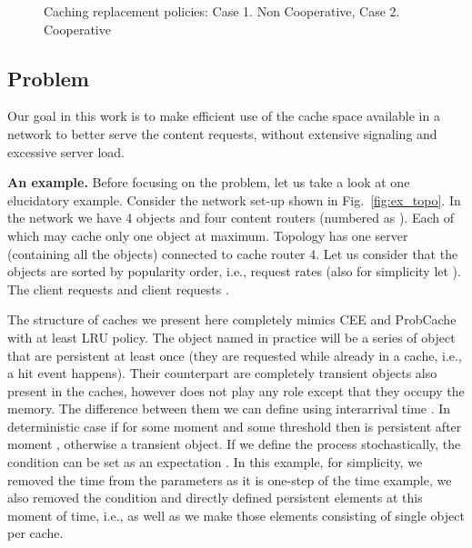 \documentclass[article]{elsarticle}
\begin{document}
\begin{figure}[t]
\centering
{}
\raisebox{3cm}{\textbf{}} 
\qquad
{}
\caption{Caching replacement policies: Case 1. Non Cooperative, Case 2. Cooperative}
\label{fig:example}
\end{figure}

\subsection{Problem}
Our goal in this work is to make efficient use of the cache space available in a network to better serve the content requests, without extensive signaling and excessive server load.

\textbf{An example.} Before focusing on the problem, let us take a look at one elucidatory example. Consider the network set-up shown in Fig.~\ref{fig:ex_topo}. In the network we have 4 objects  and four content routers (numbered as ). Each of which may cache only one object at maximum. Topology has one server (containing all the objects) connected to cache router 4. Let us consider that the objects are sorted by popularity order, i.e., request rates  (also for simplicity let ). The client  requests  and client  requests .

The structure of caches we present here completely mimics CEE and ProbCache with at least LRU policy. The object named  in practice will be a series of object that are persistent at least once (they are requested while already in a cache, i.e., a hit event happens). Their counterpart are completely transient objects  also present in the caches, however does not play any role except that they occupy the memory. The difference between them we can define using interarrival time . In deterministic case if  for some moment  and some threshold  then  is persistent after moment , otherwise a transient object. If we define the process stochastically, the condition can be set as an expectation . In this example, for simplicity, we removed the time from the parameters as it is one-step of the time example, we also removed the condition and directly defined persistent elements at this moment of time, i.e.,  as well as we make those elements consisting of single object per cache. 
\end{document}
